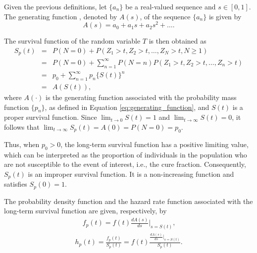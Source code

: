 Given the previous definitions, let $\{a_n\}$ be a real-valued sequence and
$s\in[0,1]$. The generating function \cite{feller1971introduction}, denoted by
$A(s)$, of the sequence $\{a_n\}$ is given by
\begin{equation}
\label{eq:generating_function}
A(s)=a_0+a_1s+a_2s^2+\ldots.
\end{equation}

The survival function of the random variable $T$ is then obtained as
\begin{eqnarray}
\label{eq:long_term_survival}
S_p(t) &=& P(N=0) + P(Z_1>t,Z_2>t,\ldots,Z_N>t,N\geq1) \nonumber \\
&=& P(N=0) + \sum_{n=1}^{\infty}P(N=n)
P(Z_1>t,Z_2>t,\ldots,Z_n>t) \nonumber \\
&=& p_0+\sum_{n=1}^{\infty}p_n\{S(t)\}^n \nonumber \\
&=& A\left(S(t)\right),
\end{eqnarray}
where $A(\cdot)$ is the generating function associated with the probability
mass function $\{p_n\}$, as defined in Equation \eqref{eq:generating_function},
and $S(t)$ is a proper survival function. Since $\lim_{t\rightarrow0}S(t)=1$ and
$\lim_{t\rightarrow\infty}S(t)=0$, it follows that $\lim_{t\rightarrow\infty}S_p(t) = A(0) = P(N=0) = p_0$.

Thus, when $p_0>0$, the long-term survival function has a positive limiting value,
which can be interpreted as the proportion of individuals in the population who are
not susceptible to the event of interest, i.e., the cure fraction. Consequently,
$S_p(t)$ is an improper survival function. It is a non-increasing function and satisfies
$S_p(0)=1$.

The probability density function and the hazard rate function associated with the long-term
survival function are given, respectively, by
\begin{eqnarray}
f_{p}(t) = f(t)\frac{dA(s)}{ds}|_{s=S(t)}\text{,}
\end{eqnarray}
\begin{eqnarray}
h_{p}(t) = \frac{f_{p}(t)}{S_{p}(t)}=f(t)\frac{\frac{dA(s)}{ds}|_{s=S(t)}}{S_{p}(t)}.
\end{eqnarray}


